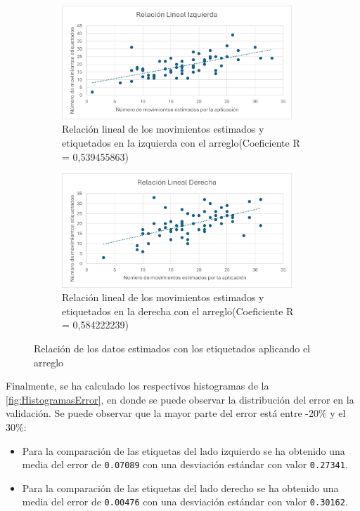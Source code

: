 \begin{figure}[H]
    \centering
    \begin{subfigure}[b]{0.95\textwidth}
        \centering
        \includegraphics[width=0.95\textwidth]{images/7/IzquierdaBien.png}
        \caption{Relación lineal de los movimientos estimados y etiquetados en la izquierda con el arreglo(Coeficiente R = 0,539455863)}
    \end{subfigure}
    \begin{subfigure}[b]{0.95\textwidth}
        \centering
        \includegraphics[width=0.95\textwidth]{images/7/DerechaBien.png}
        \caption{Relación lineal de los movimientos estimados y etiquetados en la derecha con el arreglo(Coeficiente R = 0,584222239)}
    \end{subfigure}
    \caption{Relación de los datos estimados con los etiquetados aplicando el arreglo}
    \label{fig:EtiquetadosBien}
\end{figure}
\vspace{3\baselineskip}
\clearpage
Finalmente, se ha calculado los respectivos histogramas de la \autoref{fig:HistogramasError}, en donde se puede observar la distribución del error en la validación. Se puede observar que la mayor parte del error está entre -20\% y el 30\%:
\begin{itemize}
    \item Para la comparación de las etiquetas del lado izquierdo se ha obtenido una media del error de \texttt{0.07089} con una desviación estándar con valor \texttt{0.27341}.
    \item Para la comparación de las etiquetas del lado derecho se ha obtenido una media del error de \texttt{0.00476} con una desviación estándar con valor \texttt{0.30162}.
\end{itemize}

